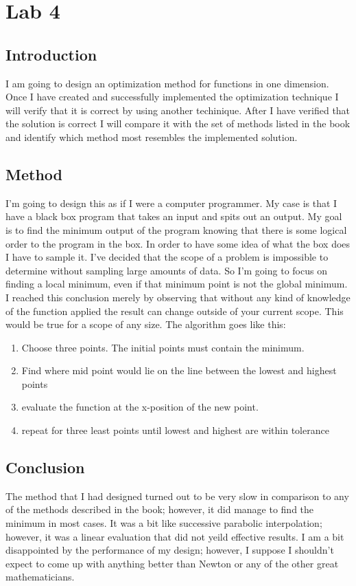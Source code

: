 \section{Lab 4}
\subsection{Introduction}
I am going to design an optimization method for functions in one dimension. Once I have created and successfully implemented the optimization technique I will verify that it is correct by using another techinique. After I have verified that the solution is correct I will compare it with the set of methods listed in the book and identify which method most resembles the implemented solution.
\subsection{Method}
I'm going to design this as if I were a computer programmer. My case is that I have a black box program that takes an input and spits out an output. My goal is to find the minimum output of the program knowing that there is some logical order to the program in the box. In order to have some idea of what the box does I have to sample it. I've decided that the scope of a problem is impossible to determine without sampling large amounts of data. So I'm going to focus on finding a local minimum, even if that minimum point is not the global minimum. I reached this conclusion merely by observing that without any kind of knowledge of the function applied the result can change outside of your current scope. This would be true for a scope of any size.
The algorithm goes like this:
\begin{enumerate}
\item Choose three points. The initial points must contain the minimum.
\item Find where mid point would lie on the line between the lowest and highest points
\item evaluate the function at the x-position of the new point.
\item repeat for three least points until lowest and highest are within tolerance
\end{enumerate}
\subsection{Conclusion}
The method that I had designed turned out to be very slow in comparison to any of the methods described in the book; however, it did manage to find the minimum in most cases. It was a bit like successive parabolic interpolation; however, it was a linear evaluation that did not yeild effective results. I am a bit disappointed by the performance of my design; however, I suppose I shouldn't expect to come up with anything better than Newton or any of the other great mathematicians.